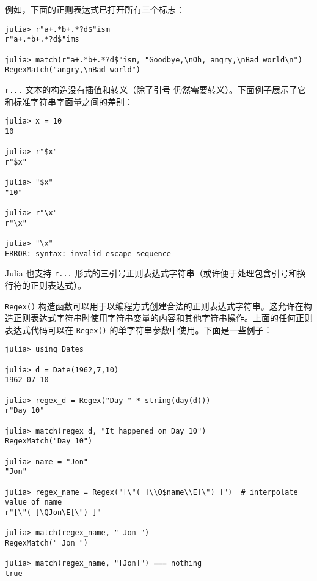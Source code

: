 例如，下面的正则表达式已打开所有三个标志：




\begin{verbatim}
julia> r"a+.*b+.*?d$"ism
r"a+.*b+.*?d$"ims

julia> match(r"a+.*b+.*?d$"ism, "Goodbye,\nOh, angry,\nBad world\n")
RegexMatch("angry,\nBad world")
\end{verbatim}



\texttt{r{\textquotedbl}...{\textquotedbl}} 文本的构造没有插值和转义（除了引号 \texttt{{\textquotedbl}} 仍然需要转义）。下面例子展示了它和标准字符串字面量之间的差别：




\begin{verbatim}
julia> x = 10
10

julia> r"$x"
r"$x"

julia> "$x"
"10"

julia> r"\x"
r"\x"

julia> "\x"
ERROR: syntax: invalid escape sequence
\end{verbatim}



Julia 也支持 \texttt{r{\textquotedbl}{\textquotedbl}{\textquotedbl}...{\textquotedbl}{\textquotedbl}{\textquotedbl}} 形式的三引号正则表达式字符串（或许便于处理包含引号和换行符的正则表达式）。



\texttt{Regex()} 构造函数可以用于以编程方式创建合法的正则表达式字符串。这允许在构造正则表达式字符串时使用字符串变量的内容和其他字符串操作。上面的任何正则表达式代码可以在 \texttt{Regex()} 的单字符串参数中使用。下面是一些例子：




\begin{verbatim}
julia> using Dates

julia> d = Date(1962,7,10)
1962-07-10

julia> regex_d = Regex("Day " * string(day(d)))
r"Day 10"

julia> match(regex_d, "It happened on Day 10")
RegexMatch("Day 10")

julia> name = "Jon"
"Jon"

julia> regex_name = Regex("[\"( ]\\Q$name\\E[\") ]")  # interpolate value of name
r"[\"( ]\QJon\E[\") ]"

julia> match(regex_name, " Jon ")
RegexMatch(" Jon ")

julia> match(regex_name, "[Jon]") === nothing
true
\end{verbatim}



